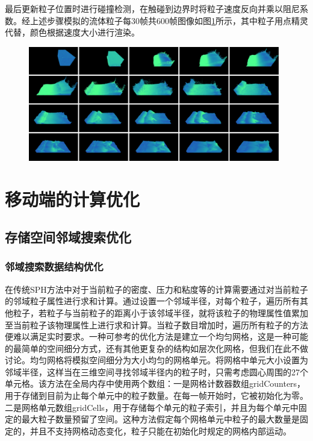 最后更新粒子位置时进行碰撞检测，在触碰到边界时将粒子速度反向并乘以阻尼系数。经上述步骤模拟的流体粒子每30帧共600帧图像如图\ref{fig:paritcleSim}所示，其中粒子用点精灵代替，颜色根据速度大小进行渲染。
\begin{figure}[ht]
 \centering
 \includegraphics[height=5cm]{image/pic3.png}
 \label{fig:paritcleSim}
\end{figure}


\section{移动端的计算优化}
\subsection{存储空间邻域搜索优化}\label{optim}

\subsubsection{邻域搜索数据结构优化}
在传统SPH方法中对于当前粒子的密度、压力和粘度等的计算需要通过对当前粒子的邻域粒子属性进行求和计算。通过设置一个邻域半径，对每个粒子，遍历所有其他粒子，若粒子与当前粒子的距离小于该邻域半径，就将该粒子的物理属性值累加至当前粒子该物理属性上进行求和计算。当粒子数目增加时，遍历所有粒子的方法便难以满足实时要求。一种可参考的优化方法是建立一个均匀网格，这是一种可能的最简单的空间细分方式，还有其他更复杂的结构如层次化网格，但我们在此不做讨论。均匀网格将模拟空间细分为大小均匀的网格单元。将网格中单元大小设置为邻域半径，这样当在三维空间寻找邻域半径内的粒子时，只需考虑圆心周围的27个单元格。该方法在全局内存中使用两个数组：一是网格计数器数组gridCounters，用于存储到目前为止每个单元中的粒子数量。在每一帧开始时，它被初始化为零。二是网格单元数组gridCells，用于存储每个单元的粒子索引，并且为每个单元中固定的最大粒子数量预留了空间。这种方法假定每个网格单元中粒子的最大数量是固定的，并且不支持网格动态变化，粒子只能在初始化时规定的网格内部运动。

